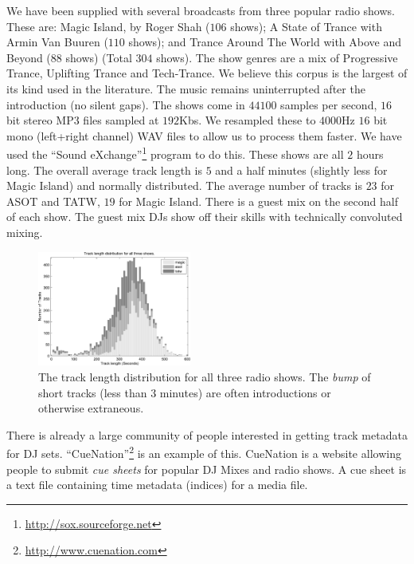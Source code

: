 \documentclass[twocolumn]{article}
\begin{document}
We have been supplied with several broadcasts from three popular radio shows. These are: Magic Island, by Roger Shah ($106$ shows); A State of Trance with Armin Van Buuren ($110$ shows); and Trance Around The World with Above and Beyond ($88$ shows) (Total $304$ shows). The show genres are a mix of Progressive Trance, Uplifting Trance and Tech-Trance. We believe this corpus is the largest of its kind used \cite{peiszer2008automatic} in the literature.  
The music remains uninterrupted after the introduction (no silent gaps). 
The shows come in $44100$ samples per second, $16$ bit stereo MP3 files sampled at $192$Kbs. We resampled these to $4000$Hz $16$ bit mono (left+right channel) WAV files to allow us to process them faster. We have used the ``Sound eXchange''\footnote{\url{http://sox.sourceforge.net}}  program to do this. These shows are all $2$ hours long. The overall average track length is $5$ and a half minutes (slightly less for Magic Island) and normally distributed. The average number of tracks is $23$ for ASOT and TATW, $19$ for Magic Island. There is a guest mix on the second half of each show. The guest mix DJs show off their skills with technically convoluted mixing.

\begin{figure}
\centering
\includegraphics[width=0.45\textwidth]{images/tracklength.pdf}

\caption{The track length distribution for all three radio shows. The \textit{bump} of short tracks (less than $3$ minutes) are often introductions or otherwise extraneous.}
\label{fig:tracklengths}
\end{figure} 

There is already a large community of people interested in getting track metadata for DJ sets. ``CueNation''\footnote{\url{http://www.cuenation.com}} is an example of this. CueNation is a website allowing people to submit \textit{cue sheets} for popular DJ Mixes and radio shows. A cue sheet is a text file containing time metadata (indices) for a media file.
\end{document}
